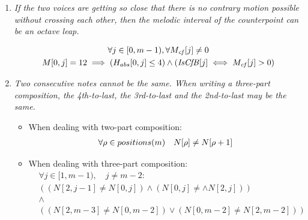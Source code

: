 \begin{enumerate}[wide, label=\bfseries 2.M\arabic*]

\item\label{rule:octaveleap}{ \textit{If the two voices are getting so close that there is no contrary motion possible without crossing each other, then the melodic interval of the counterpoint can be an octave leap.}}

\begin{equation}
    \begin{gathered}
        \forall j \in [0, m-1), \forall M_{\mathit{cf}}[j] \neq 0\\
        M[0, j] = 12 \implies (H_{abs}[0, j] \leq 4) \land (\mathit{IsCfB}[j] \iff M_{\mathit{cf}}[j]>0)
    \end{gathered}
\end{equation}

\item\label{rule:notsamecons}{ \textit{Two consecutive notes cannot be the same. When writing a three-part composition, the 4th-to-last, the 3rd-to-last and the 2nd-to-last may be the same.}}

\begin{itemize} \item  When dealing with two-part composition:\begin{equation}
    \begin{gathered}
        \forall \rho \in positions(m) \quad
        N[\rho] \neq N[\rho+1]
    \end{gathered}
\end{equation}

\item When dealing with three-part composition:\begin{equation}
  \begin{aligned}
      &\forall j \in [1, m-1), \quad j \neq m-2:\\
      &((N[2, j-1] \neq N[0, j]) \land (N[0, j] \neq \land N[2, j])) \\
      &\land \\
      & ((N[2, m-3] \neq N[0, m-2]) \lor (N[0, m-2] \neq N[2, m-2]) )
  \end{aligned}
\end{equation}
\end{itemize}


\end{enumerate}
